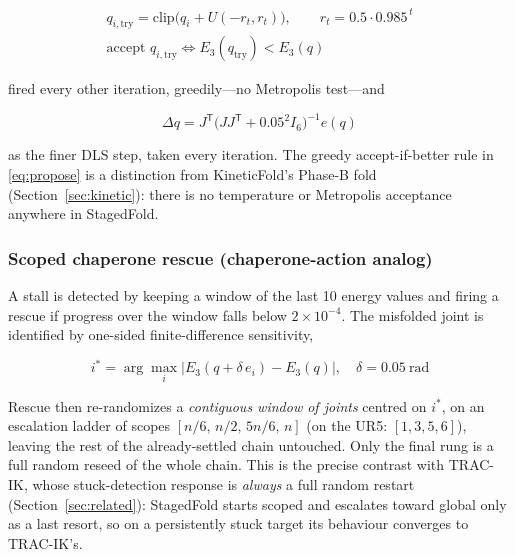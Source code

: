 \documentclass[10pt,conference]{IEEEtran}
\newcommand{\tp}{^{\mathsf{T}}}                       %
\newcommand{\clip}{\mathrm{clip}}
\begin{document}
\begin{equation}
\begin{gathered}
q_{i,\mathrm{try}} = \clip\big(q_i + U(-r_t, r_t)\big),
\qquad r_t = 0.5 \cdot 0.985^{\,t}\\[2pt]
\text{accept } q_{i,\mathrm{try}}
\iff E_{3}(q_{\mathrm{try}}) < E_{3}(q)
\end{gathered}
\label{eq:propose}
\end{equation}

fired every other iteration, greedily---no Metropolis test---and

\begin{equation}
\Delta q = J\tp \big(J J\tp + 0.05^2 I_6\big)^{-1} e(q)
\label{eq:dlsfine}
\end{equation}

as the finer DLS step, taken every iteration. The greedy accept-if-better rule
in \eqref{eq:propose} is a distinction from KineticFold's Phase-B fold
(Section~\ref{sec:kinetic}): there is no temperature or Metropolis acceptance
anywhere in StagedFold.

\subsubsection{Scoped chaperone rescue (chaperone-action analog)}
\label{sec:rescue}
A stall is detected by keeping a window of the last 10 energy values and firing a
rescue if progress over the window falls below $2\times10^{-4}$. The misfolded
joint is identified by one-sided finite-difference sensitivity,

\begin{equation}
i^{*} = \arg\max_i \big| E_{3}(q + \delta\,e_i) - E_{3}(q) \big|,
\quad \delta = 0.05\ \mathrm{rad}
\label{eq:sens}
\end{equation}

Rescue then re-randomizes a \emph{contiguous window of joints} centred on
$i^{*}$, on an escalation ladder of scopes $[n/6,\, n/2,\, 5n/6,\, n]$ (on the
UR5: $[1, 3, 5, 6]$), leaving the rest of the already-settled chain untouched.
Only the final rung is a full random reseed of the whole chain. This is the
precise contrast with TRAC-IK, whose stuck-detection response is \emph{always} a
full random restart (Section~\ref{sec:related}): StagedFold starts scoped and
escalates toward global only as a last resort, so on a persistently stuck target
its behaviour converges to TRAC-IK's.
\end{document}
